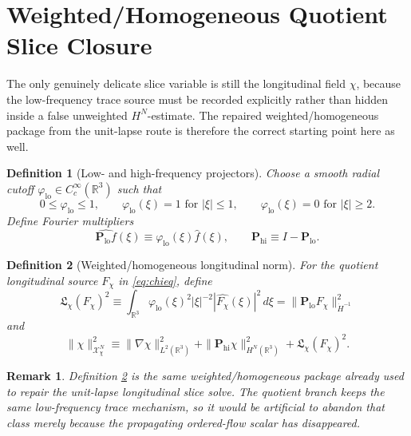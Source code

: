 \documentclass[11pt]{article}
\newtheorem{definition}{Definition}
\newtheorem{remark}{Remark}
\begin{document}
\section{Weighted/Homogeneous Quotient Slice Closure}

The only genuinely delicate slice variable is still the longitudinal field \(\chi\), because the low-frequency trace source must be recorded explicitly rather than hidden inside a false unweighted \(H^N\)-estimate. The repaired weighted/homogeneous package from the unit-lapse route is therefore the correct starting point here as well.

\begin{definition}[Low- and high-frequency projectors]
\label{def:projectors}
Choose a smooth radial cutoff \(\varphi_{\mathrm{lo}}\in C_c^\infty(\mathbb R^3)\) such that
\[
0\le \varphi_{\mathrm{lo}}\le 1,
\qquad
\varphi_{\mathrm{lo}}(\xi)=1 \text{ for } |\xi|\le 1,
\qquad
\varphi_{\mathrm{lo}}(\xi)=0 \text{ for } |\xi|\ge 2.
\]
Define Fourier multipliers
\begin{equation}
\widehat{\mathbf P_{\mathrm{lo}}f}(\xi)
\equiv
\varphi_{\mathrm{lo}}(\xi)\widehat f(\xi),
\qquad
\mathbf P_{\mathrm{hi}}\equiv I-\mathbf P_{\mathrm{lo}}.
\label{eq:projectors}
\end{equation}
\end{definition}

\begin{definition}[Weighted/homogeneous longitudinal norm]
\label{def:Xchi}
For the quotient longitudinal source \(F_\chi\) in \eqref{eq:chieq}, define
\begin{equation}
\mathfrak L_\chi(F_\chi)^2
\equiv
\int_{\mathbb R^3}
\varphi_{\mathrm{lo}}(\xi)^2
|\xi|^{-2}
|\widehat{F_\chi}(\xi)|^2\,d\xi
=
\|\mathbf P_{\mathrm{lo}}F_\chi\|_{\dot H^{-1}}^2
\label{eq:Lchi}
\end{equation}
and
\begin{equation}
\|\chi\|_{\mathcal X_\chi^N}^2
\equiv
\|\nabla\chi\|_{L^2(\mathbb R^3)}^2
+\|\mathbf P_{\mathrm{hi}}\chi\|_{H^N(\mathbb R^3)}^2
+\mathfrak L_\chi(F_\chi)^2.
\label{eq:Xchi}
\end{equation}
\end{definition}

\begin{remark}
Definition \ref{def:Xchi} is the same weighted/homogeneous package already used to repair the unit-lapse longitudinal slice solve. The quotient branch keeps the same low-frequency trace mechanism, so it would be artificial to abandon that class merely because the propagating ordered-flow scalar has disappeared.
\end{remark}
\end{document}
